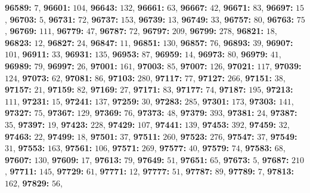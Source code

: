 \textsf{\bfseries 96589:} $7$, \textsf{\bfseries 96601:} $104$, \textsf{\bfseries 96643:} $132$, \textsf{\bfseries 96661:} $63$, \textsf{\bfseries 96667:} $42$, \textsf{\bfseries 96671:} $83$, \textsf{\bfseries 96697:} $15$, \textsf{\bfseries 96703:} $5$, \textsf{\bfseries 96731:} $72$, \textsf{\bfseries 96737:} $153$, \textsf{\bfseries 96739:} $13$, \textsf{\bfseries 96749:} $33$, \textsf{\bfseries 96757:} $80$, \textsf{\bfseries 96763:} $75$, \textsf{\bfseries 96769:} $111$, \textsf{\bfseries 96779:} $47$, \textsf{\bfseries 96787:} $72$, \textsf{\bfseries 96797:} $209$, \textsf{\bfseries 96799:} $278$, \textsf{\bfseries 96821:} $18$, \textsf{\bfseries 96823:} $12$, \textsf{\bfseries 96827:} $24$, \textsf{\bfseries 96847:} $11$, \textsf{\bfseries 96851:} $130$, \textsf{\bfseries 96857:} $76$, \textsf{\bfseries 96893:} $39$, \textsf{\bfseries 96907:} $101$, \textsf{\bfseries 96911:} $33$, \textsf{\bfseries 96931:} $135$, \textsf{\bfseries 96953:} $87$, \textsf{\bfseries 96959:} $14$, \textsf{\bfseries 96973:} $80$, \textsf{\bfseries 96979:} $41$, \textsf{\bfseries 96989:} $79$, \textsf{\bfseries 96997:} $26$, \textsf{\bfseries 97001:} $161$, \textsf{\bfseries 97003:} $85$, \textsf{\bfseries 97007:} $126$, \textsf{\bfseries 97021:} $117$, \textsf{\bfseries 97039:} $124$, \textsf{\bfseries 97073:} $62$, \textsf{\bfseries 97081:} $86$, \textsf{\bfseries 97103:} $280$, \textsf{\bfseries 97117:} $77$, \textsf{\bfseries 97127:} $266$, \textsf{\bfseries 97151:} $38$, \textsf{\bfseries 97157:} $21$, \textsf{\bfseries 97159:} $82$, \textsf{\bfseries 97169:} $27$, \textsf{\bfseries 97171:} $83$, \textsf{\bfseries 97177:} $74$, \textsf{\bfseries 97187:} $195$, \textsf{\bfseries 97213:} $111$, \textsf{\bfseries 97231:} $15$, \textsf{\bfseries 97241:} $137$, \textsf{\bfseries 97259:} $30$, \textsf{\bfseries 97283:} $285$, \textsf{\bfseries 97301:} $173$, \textsf{\bfseries 97303:} $141$, \textsf{\bfseries 97327:} $75$, \textsf{\bfseries 97367:} $129$, \textsf{\bfseries 97369:} $76$, \textsf{\bfseries 97373:} $48$, \textsf{\bfseries 97379:} $393$, \textsf{\bfseries 97381:} $24$, \textsf{\bfseries 97387:} $35$, \textsf{\bfseries 97397:} $19$, \textsf{\bfseries 97423:} $228$, \textsf{\bfseries 97429:} $107$, \textsf{\bfseries 97441:} $139$, \textsf{\bfseries 97453:} $392$, \textsf{\bfseries 97459:} $32$, \textsf{\bfseries 97463:} $22$, \textsf{\bfseries 97499:} $18$, \textsf{\bfseries 97501:} $37$, \textsf{\bfseries 97511:} $260$, \textsf{\bfseries 97523:} $276$, \textsf{\bfseries 97547:} $37$, \textsf{\bfseries 97549:} $31$, \textsf{\bfseries 97553:} $163$, \textsf{\bfseries 97561:} $106$, \textsf{\bfseries 97571:} $269$, \textsf{\bfseries 97577:} $40$, \textsf{\bfseries 97579:} $74$, \textsf{\bfseries 97583:} $68$, \textsf{\bfseries 97607:} $130$, \textsf{\bfseries 97609:} $17$, \textsf{\bfseries 97613:} $79$, \textsf{\bfseries 97649:} $51$, \textsf{\bfseries 97651:} $65$, \textsf{\bfseries 97673:} $5$, \textsf{\bfseries 97687:} $210$, \textsf{\bfseries 97711:} $145$, \textsf{\bfseries 97729:} $61$, \textsf{\bfseries 97771:} $12$, \textsf{\bfseries 97777:} $51$, \textsf{\bfseries 97787:} $89$, \textsf{\bfseries 97789:} $7$, \textsf{\bfseries 97813:} $162$, \textsf{\bfseries 97829:} $56$, 
